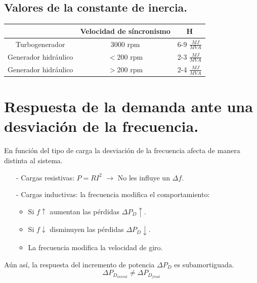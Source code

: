 \subsection{Valores de la constante de inercia.}
\begin{table}[H]
	\centering
	\renewcommand{\arraystretch}{1.5}
	\begin{tabular}{ccc}
		\hline
		&Velocidad de síncronismo& H\\
		\hline
		Turbogenerador & 3000 rpm&6-9 $\frac{MJ}{MVA}$ \\
		\hline
		Generador hidráulico & $<$200 rpm&2-3 $\frac{MJ}{MVA}$ \\
		\hline
		Generador hidráulico & $>$200 rpm&2-4 $\frac{MJ}{MVA}$ \\
		\hline
	\end{tabular}
\end{table}
\section{Respuesta de la demanda ante una desviación de la frecuencia.}
En función del tipo de carga la desviación de la frecuencia afecta de manera distinta al sistema.
\begin{itemize}
	\item [-] Cargas resistivas: $P=RI^2$ $\rightarrow$ No les influye un $\Delta f$.
	\item [-] Cargas inductivas: la frecuencia modifica el comportamiento:
	\begin{itemize}
		\item Si $f\uparrow$ aumentan las pérdidas $\Delta P_D \uparrow$.
		\item  Si $f\downarrow$ disminuyen las pérdidas $\Delta P_D \downarrow$.
		\item La frecuencia modifica la velocidad de giro.
	\end{itemize}
\end{itemize}



Aún así, la respuesta del incremento de potencia $\Delta P_D$ es subamortiguada.
 \[\Delta P_{D_{inicial}}\ne \Delta P_{D_{final}}\] 
  
